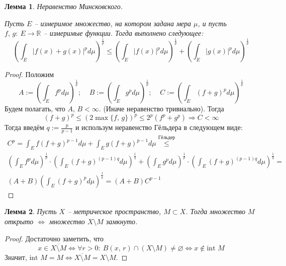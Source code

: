\documentclass[a4paper,12pt]{article}
\renewcommand{\leq}{\ensuremath{\leqslant}}
\renewcommand{\emptyset}{\ensuremath{\varnothing}}
\theoremstyle{plain}
\newtheorem{lemma}{Лемма}[section]
\theoremstyle{definition}
\theoremstyle{remark}
\begin{document}
\begin{lemma}
	Неравенство Минсковского.

	Пусть $E$ -- измеримое множество, на котором задана мера $\mu$, и пусть $f,\,g :\: E \to \mathbb{R}$ -- измеримые функции. Тогда выполнено следующее:
	\[
		\left(\int_E \vert f(x) + g(x)\vert^pd\mu\right)^{\frac{1}{p}} \leq \left(\int_E \vert f(x)\vert^p d\mu\right)^{\frac{1}{p}} + \left(\int_E \vert g(x)\vert^pd\mu\right)^{\frac{1}{p}}
	\]
\end{lemma}

\begin{proof}
	Положим
	\[
		A := \left(\int_Ef^pd\mu\right)^{\frac{1}{p}} ;\;\;\;\; B := \left(\int_Eg^pd\mu\right)^{\frac{1}{p}} ;\;\;\;\; C := \left(\int_E(f + g)^pd\mu\right)^{\frac{1}{p}}
	\]
	Будем полагать, что $A,\,B < \infty$. (Иначе неравенство тривиально). Тогда
	\[
		(f + g)^p \leq (2\max\{f,\,g\})^p \leq 2^p(f^p + g^p) \Rightarrow C < \infty
	\]
	Тогда введём $q := \frac{p}{p-1}$ и использум неравенство Гёльдера в следующем виде:
	\begin{align*}
		C^p = \int_E f(f + g)^{p - 1}d\mu + \int_Eg(f + g)^{p-1}d\mu \overset{\text{Гёльдер}}{\leq}                                                                                                                 \\
		\left(\int_E f^pd\mu\right)^{\frac{1}{p}}\cdot\left(\int_E(f + g)^{(p - 1)q}d\mu\right)^{\frac{1}{q}} + \left(\int_Eg^pd\mu\right)^{\frac{1}{p}}\cdot\left(\int_E(f + g)^{(p-1)q}d\mu\right)^{\frac{1}{q}}= \\
		(A + B)\left(\int_E (f + g)^pd\mu\right)^{\frac{1}{q}} = (A + B)C^{p -1}
	\end{align*}
\end{proof}

\begin{lemma}
	Пусть $X$ -- метрическое пространство, $M \subset X$. Тогда множество $M$ открыто $\Leftrightarrow$ множество $X \setminus M$ замкнуто.
\end{lemma}

\begin{proof}
	Достаточно заметить, что
	\[
		x \in \overline{X \setminus M} \Leftrightarrow \forall r > 0 :\: B(x,\, r) \cap (X \setminus M) \neq \emptyset \Leftrightarrow x \not\in \text{int }M
	\]
	Значит, $\text{int }M = M \Leftrightarrow \overline{X \setminus M} = X \setminus M$.
\end{proof}
\end{document}
